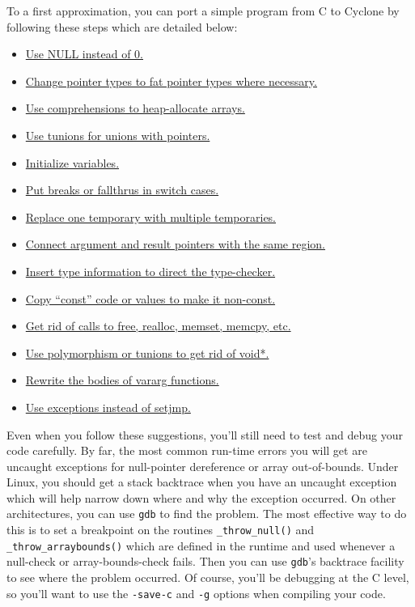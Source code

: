 To a first approximation, you can port a simple program
from C to Cyclone by following these steps which are
detailed below:
\begin{itemize}
\item \hyperlink{port:null}{Use NULL instead of 0.}
\item \hyperlink{port:pointers}{Change pointer types to fat pointer types where necessary.}  
\item \hyperlink{port:malloc}{Use comprehensions to heap-allocate arrays.}
\item \hyperlink{port:unions}{Use tunions for unions with pointers.}
\item \hyperlink{port:initialize}{Initialize variables.}  
\item \hyperlink{port:cases}{Put breaks or fallthrus in switch cases.} 
\item \hyperlink{port:temp}{Replace one temporary with multiple temporaries.}  
\item \hyperlink{port:rgns}{Connect argument and result pointers with the same region.}
\item \hyperlink{port:types}{Insert type information to direct the type-checker.}
\item \hyperlink{port:const}{Copy ``const'' code or values to make it non-const.}  
\item \hyperlink{port:free}{Get rid of calls to free, realloc, memset, memcpy, etc.}
\item \hyperlink{port:poly}{Use polymorphism or tunions to get rid of void*.}  
\item \hyperlink{port:vararg}{Rewrite the bodies of vararg functions.}
\item \hyperlink{port:setjmp}{Use exceptions instead of setjmp.}
\end{itemize}

Even when you follow these suggestions, you'll still need to test and
debug your code carefully.  By far, the most common run-time errors
you will get are uncaught exceptions for null-pointer dereference
or array out-of-bounds.  Under Linux, you should get a stack backtrace
when you have an uncaught exception which will help narrow down
where and why the exception occurred.  On other architectures, you
can use \texttt{gdb} to find the problem.  The most effective way
to do this is to set a breakpoint on the routines \texttt{\_throw\_null()}
and \texttt{\_throw\_arraybounds()} which are defined in the
runtime and used whenever a null-check or array-bounds-check fails.
Then you can use \texttt{gdb}'s backtrace facility to see where
the problem occurred.  Of course, you'll be debugging at the C
level, so you'll want to use the \texttt{-save-c} and \texttt{-g}
options when compiling your code.  

